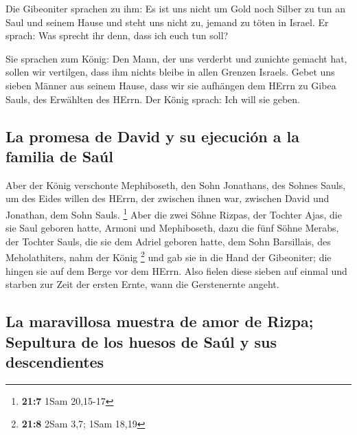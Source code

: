  Die Gibeoniter sprachen zu ihm: Es ist uns nicht um Gold
noch Silber zu tun an Saul und seinem Hause und steht uns nicht zu,
jemand zu töten in Israel. Er sprach: Was sprecht ihr denn, dass ich
euch tun soll?

 Sie sprachen zum König: Den Mann, der uns verderbt und
zunichte gemacht hat, sollen wir vertilgen, dass ihm nichts bleibe in
allen Grenzen Israels.  Gebet uns sieben Männer aus seinem
Hause, dass wir sie aufhängen dem HErrn zu Gibea Sauls, des Erwählten
des HErrn. Der König sprach: Ich will sie geben.

\hypertarget{la-promesa-de-david-y-su-ejecuciuxf3n-a-la-familia-de-sauxfal}{%
\subsection{La promesa de David y su ejecución a la familia de
Saúl}\label{la-promesa-de-david-y-su-ejecuciuxf3n-a-la-familia-de-sauxfal}}

 Aber der König verschonte Mephiboseth, den Sohn
Jonathans, des Sohnes Sauls, um des Eides willen des HErrn, der zwischen
ihnen war, zwischen David und Jonathan, dem Sohn Sauls. \footnote{\textbf{21:7}
  1Sam 20,15-17}  Aber die zwei Söhne Rizpas, der Tochter
Ajas, die sie Saul geboren hatte, Armoni und Mephiboseth, dazu die fünf
Söhne Merabs, der Tochter Sauls, die sie dem Adriel geboren hatte, dem
Sohn Barsillais, des Meholathiters, nahm der König \footnote{\textbf{21:8}
  2Sam 3,7; 1Sam 18,19}  und gab sie in die Hand der
Gibeoniter; die hingen sie auf dem Berge vor dem HErrn. Also fielen
diese sieben auf einmal und starben zur Zeit der ersten Ernte, wann die
Gerstenernte angeht.

\hypertarget{la-maravillosa-muestra-de-amor-de-rizpa-sepultura-de-los-huesos-de-sauxfal-y-sus-descendientes}{%
\subsection{La maravillosa muestra de amor de Rizpa; Sepultura de los
huesos de Saúl y sus
descendientes}\label{la-maravillosa-muestra-de-amor-de-rizpa-sepultura-de-los-huesos-de-sauxfal-y-sus-descendientes}}

